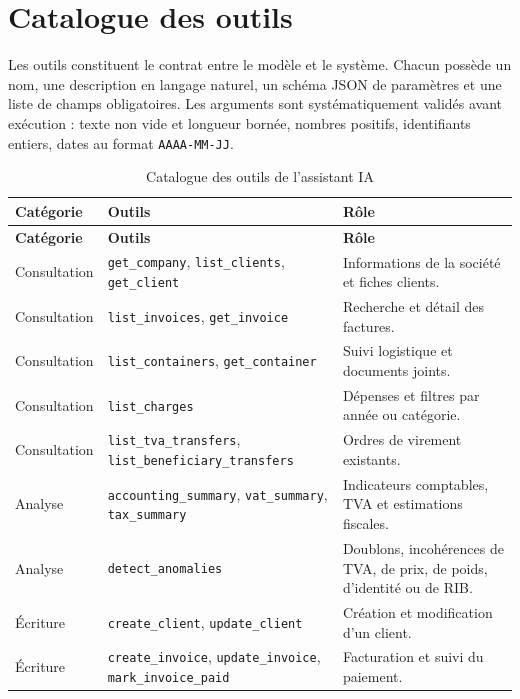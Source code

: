 \documentclass[12pt,a4paper,oneside]{report}
\newcommand{\code}[1]{\texttt{#1}}
\begin{document}
\section{Catalogue des outils}
Les outils constituent le contrat entre le modèle et le système. Chacun possède un nom, une description en langage naturel, un schéma JSON de paramètres et une liste de champs obligatoires. Les arguments sont systématiquement validés avant exécution : texte non vide et longueur bornée, nombres positifs, identifiants entiers, dates au format \code{AAAA-MM-JJ}.

\begin{longtable}{p{3.2cm}p{5.8cm}p{5.2cm}}
\caption{Catalogue des outils de l'assistant IA}\label{tab:agent-tools}\\
\toprule \textbf{Catégorie} & \textbf{Outils} & \textbf{Rôle}\\
\midrule
\endfirsthead
\toprule \textbf{Catégorie} & \textbf{Outils} & \textbf{Rôle}\\
\midrule
\endhead
Consultation & \code{\footnotesize get\_company}, \code{\footnotesize list\_clients}, \code{\footnotesize get\_client} & Informations de la société et fiches clients.\\
Consultation & \code{\footnotesize list\_invoices}, \code{\footnotesize get\_invoice} & Recherche et détail des factures.\\
Consultation & \code{\footnotesize list\_containers}, \code{\footnotesize get\_container} & Suivi logistique et documents joints.\\
Consultation & \code{\footnotesize list\_charges} & Dépenses et filtres par année ou catégorie.\\
Consultation & \code{\footnotesize list\_tva\_transfers}, \code{\footnotesize list\_beneficiary\_transfers} & Ordres de virement existants.\\
Analyse & \code{\footnotesize accounting\_summary}, \code{\footnotesize vat\_summary}, \code{\footnotesize tax\_summary} & Indicateurs comptables, TVA et estimations fiscales.\\
Analyse & \code{\footnotesize detect\_anomalies} & Doublons, incohérences de TVA, de prix, de poids, d'identité ou de RIB.\\
Écriture & \code{\footnotesize create\_client}, \code{\footnotesize update\_client} & Création et modification d'un client.\\
Écriture & \code{\footnotesize create\_invoice}, \code{\footnotesize update\_invoice}, \code{\footnotesize mark\_invoice\_paid} & Facturation et suivi du paiement.\\

\end{longtable}
\end{document}
